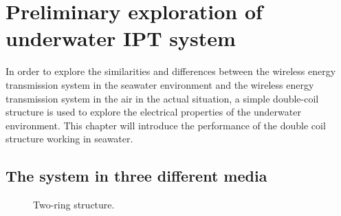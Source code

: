 \chapter{Preliminary exploration of underwater IPT system}

In order to explore the similarities and differences between the wireless energy transmission system in the seawater environment and the wireless energy transmission system in the air in the actual situation, a simple double-coil structure is used to explore the electrical properties of the underwater environment. This chapter will introduce the performance of the double coil structure working in seawater.

\section{The system in three different media}

\begin{figure}[!b]
    \caption{Two-ring structure.}
    \label{fig:3_two_ring_coil}
\end{figure}

